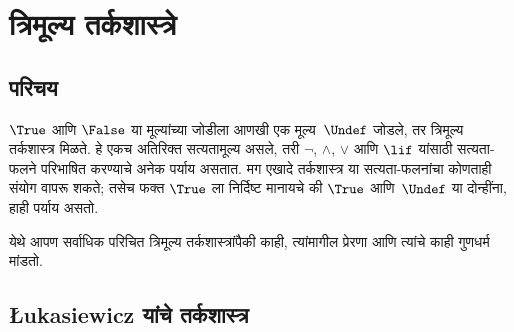 \chapter{त्रिमूल्य तर्कशास्त्रे}\label{mvl:thr:chap}









\section{परिचय}\label{mvl:thr:int:sec}

$\True$ आणि $\False$ या मूल्यांच्या जोडीला आणखी एक मूल्य~$\Undef$
जोडले, तर त्रिमूल्य तर्कशास्त्र मिळते. हे एकच अतिरिक्त
सत्यतामूल्य असले, तरी $\lnot$, $\land$, $\lor$ आणि $\lif$
यांसाठी सत्यता-फलने परिभाषित करण्याचे अनेक पर्याय असतात.
मग एखादे तर्कशास्त्र या सत्यता-फलनांचा कोणताही संयोग वापरू
शकते; तसेच फक्त $\True$ ला निर्दिष्ट मानायचे की $\True$
आणि~$\Undef$ या दोन्हींना, हाही पर्याय असतो.

येथे आपण सर्वाधिक परिचित त्रिमूल्य तर्कशास्त्रांपैकी काही,
त्यांमागील प्रेरणा आणि त्यांचे काही गुणधर्म मांडतो.













\section{\L ukasiewicz यांचे तर्कशास्त्र}\label{mvl:thr:luk:sec}

